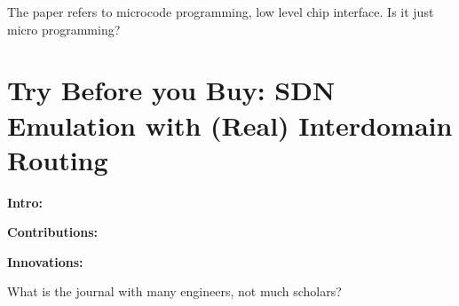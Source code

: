 The paper refers to microcode programming, low level chip interface. Is it just micro programming?

\section{Try Before you Buy: SDN Emulation with (Real) Interdomain Routing}
\label{sec:9}

\textbf{Intro:}

\textbf{Contributions:}

\textbf{Innovations:}

What is the journal with many engineers, not much scholars?

